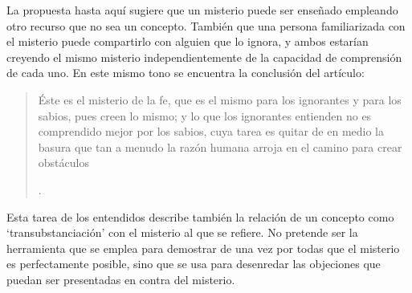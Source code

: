 La propuesta hasta aquí sugiere que un misterio puede ser enseñado empleando otro recurso que no sea un concepto. También que una persona familiarizada con el misterio puede compartirlo con alguien que lo ignora, y ambos estarían creyendo el mismo misterio independientemente de la capacidad de comprensión de cada uno. En este mismo tono se encuentra la conclusión del artículo: \blockquote[{\Cite[94]{torralbaynubiola2005fayeh:ot}}.
]{Éste es el misterio de la fe, que es el mismo para los ignorantes y para los sabios, pues creen lo mismo; y lo que los ignorantes entienden no es comprendido mejor por los sabios, cuya tarea es quitar de en medio la basura que tan a menudo la razón humana arroja en el camino para crear obstáculos}. Esta tarea de los entendidos describe también la relación de un concepto como `transubstanciación' con el misterio al que se refiere. No pretende ser la herramienta que se emplea para demostrar de una vez por todas que el misterio es perfectamente posible, sino que se usa para desenredar las objeciones que puedan ser presentadas en contra del misterio.

